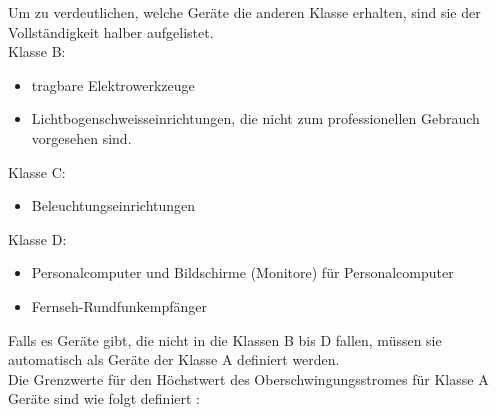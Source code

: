 Um zu verdeutlichen, welche Geräte die anderen Klasse erhalten, sind sie der Vollständigkeit halber aufgelistet.\\
Klasse B:
\begin{itemize}
	\item tragbare Elektrowerkzeuge 	
	\item Lichtbogenschweisseinrichtungen, die nicht zum professionellen Gebrauch vorgesehen sind.
\end{itemize} 
Klasse C:
\begin{itemize}
	\item Beleuchtungseinrichtungen	
\end{itemize} 
Klasse D:
\begin{itemize}
	\item Personalcomputer und Bildschirme (Monitore) für Personalcomputer	
	\item Fernseh-Rundfunkempfänger
\end{itemize}

\newpage
Falls es Geräte gibt, die nicht in die Klassen B bis D fallen, müssen sie automatisch als Geräte der Klasse A definiert werden.\\
Die Grenzwerte für den Höchstwert des Oberschwingungsstromes für Klasse A Geräte sind wie folgt definiert \cite{EMVNorm}:

